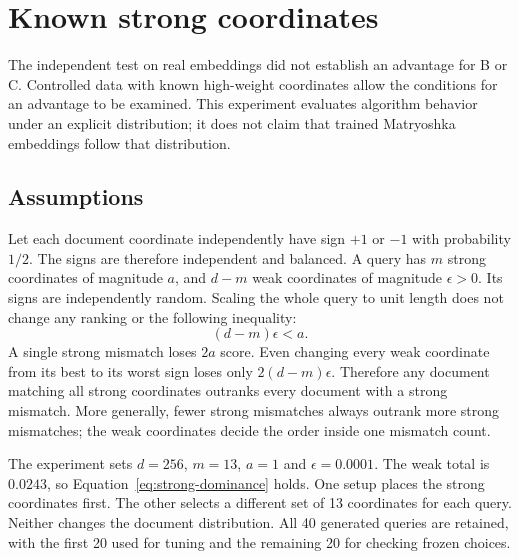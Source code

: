 \section{Known strong coordinates}
\label{sec:controlled}
The independent test on real embeddings did not establish an advantage for B or C.
Controlled data with known high-weight coordinates allow the conditions for an advantage
to be examined. This experiment evaluates algorithm behavior under an explicit distribution;
it does not claim that trained Matryoshka embeddings follow that distribution.

\subsection{Assumptions}
Let each document coordinate independently have sign $+1$ or
$-1$ with probability $1/2$. The signs are therefore independent and balanced. A query has $m$ strong coordinates of magnitude $a$, and
$d-m$ weak coordinates of magnitude $\epsilon>0$. Its signs are independently random.
Scaling the whole query to unit length does not change any ranking or the following inequality:
\begin{equation}
(d-m)\epsilon<a.
\label{eq:strong-dominance}
\end{equation}
A single strong mismatch loses $2a$ score. Even changing every weak coordinate from its best
to its worst sign loses only $2(d-m)\epsilon$. Therefore any document matching all strong
coordinates outranks every document with a strong mismatch. More generally, fewer strong
mismatches always outrank more strong mismatches; the weak coordinates decide the order inside
one mismatch count.

The experiment sets $d=256$, $m=13$, $a=1$ and $\epsilon=0.0001$. The weak total is $0.0243$,
so Equation~\eqref{eq:strong-dominance} holds. One setup places the strong coordinates first.
The other selects a different set of 13 coordinates for each query. Neither changes the document
distribution. All 40 generated queries are retained, with the first 20 used for tuning and the
remaining 20 for checking frozen choices.

